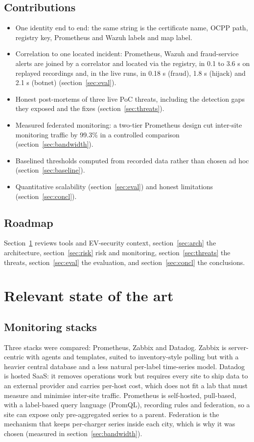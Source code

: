 \documentclass[a4paper,11pt]{article}
\numberwithin{table}{section}
\begin{document}
\subsection{Contributions}
\begin{itemize}
\item One identity end to end: the same string is the certificate name, OCPP path, registry key, Prometheus and Wazuh labels and map label.
\item Correlation to one located incident: Prometheus, Wazuh and fraud-service alerts are joined by a correlator and located via the registry, in 0.1 to 3.6 s on replayed recordings and, in the live runs, in 0.18 s (fraud), 1.8 s (hijack) and 2.1 s (botnet) (section~\ref{sec:eval}).
\item Honest post-mortems of three live PoC threats, including the detection gaps they exposed and the fixes (section~\ref{sec:threats}).
\item Measured federated monitoring: a two-tier Prometheus design cut inter-site monitoring traffic by 99.3\% in a controlled comparison (section~\ref{sec:bandwidth}).
\item Baselined thresholds computed from recorded data rather than chosen ad hoc (section~\ref{sec:baseline}).
\item Quantitative scalability (section~\ref{sec:eval}) and honest limitations (section~\ref{sec:concl}).
\end{itemize}

\subsection{Roadmap}
Section~\ref{sec:soa} reviews tools and EV-security context, section~\ref{sec:arch} the architecture, section~\ref{sec:risk} risk and monitoring, section~\ref{sec:threats} the threats, section~\ref{sec:eval} the evaluation, and section~\ref{sec:concl} the conclusions.

\section{Relevant state of the art}\label{sec:soa}

\subsection{Monitoring stacks}
Three stacks were compared: Prometheus, Zabbix and Datadog. Zabbix \cite{zabbix} is server-centric with agents and templates, suited to inventory-style polling but with a heavier central database and a less natural per-label time-series model. Datadog \cite{datadog} is hosted SaaS: it removes operations work but requires every site to ship data to an external provider and carries per-host cost, which does not fit a lab that must measure and minimise inter-site traffic. Prometheus \cite{prometheus} is self-hosted, pull-based, with a label-based query language (PromQL), recording rules and federation, so a site can expose only pre-aggregated series to a parent. Federation is the mechanism that keeps per-charger series inside each city, which is why it was chosen (measured in section~\ref{sec:bandwidth}).
\end{document}
